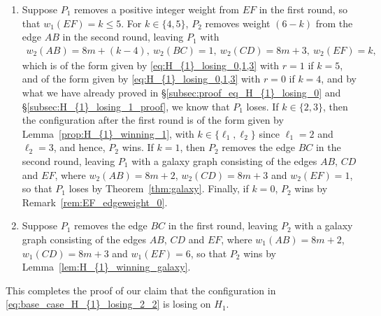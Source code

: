 \documentclass[11pt,reqno]{amsart}
\theoremstyle{definition}
\theoremstyle{definition}
\begin{document}
\begin{enumerate}
\begin{enumerate}
\item Suppose $w_{1}(AB)=8m+i$ for $i \in \{0,1\}$ and $w_{1}(BC)=0$. This leaves $P_{2}$ with a galaxy graph consisting of the edges $AB$, $CD$ and $EF$, where $w_{1}(AB)=8m+i$, $w_{1}(CD)=8m+3$ and $w_{1}(EF)=6$, and $P_{2}$ wins by Lemma~\ref{lem:H_{1}_winning_galaxy}. 

\item Finally, suppose $w_{1}(AB)=8n+\ell_{1}$ for some $n < m$ and $\ell_{1} \in \{0,1,\ldots,7\}$, and as argued above in \eqref{item_1}, this leads to $P_{2}$ winning due to Lemma~\ref{prop:H_{1}_winning_1}.
\end{enumerate}

\item Suppose $P_{1}$ removes a positive integer weight from $EF$ in the first round, so that $w_{1}(EF)=k\leqslant 5$. For $k \in \{4,5\}$, $P_{2}$ removes weight $(6-k)$ from the edge $AB$ in the second round, leaving $P_{1}$ with 
\begin{align}
w_{2}(AB)=8m+(k-4),\ w_{2}(BC)=1,\ w_{2}(CD)=8m+3,\ w_{2}(EF)=k,\nonumber
\end{align}
which is of the form given by \eqref{eq:H_{1}_losing_0,1,3} with $r=1$ if $k=5$, and of the form given by \eqref{eq:H_{1}_losing_0,1,3} with $r=0$ if $k=4$, and by what we have already proved in \S\ref{subsec:proof_eq_H_{1}_losing_0} and \S\ref{subsec:H_{1}_losing_1_proof}, we know that $P_{1}$ loses. If $k \in \{2,3\}$, then the configuration after the first round is of the form given by Lemma~\ref{prop:H_{1}_winning_1}, with $k \in \{\ell_{1},\ell_{2}\}$ since $\ell_{1}=2$ and $\ell_{2}=3$, and hence, $P_{2}$ wins. If $k=1$, then $P_{2}$ removes the edge $BC$ in the second round, leaving $P_{1}$ with a galaxy graph consisting of the edges $AB$, $CD$ and $EF$, where $w_{2}(AB)=8m+2$, $w_{2}(CD)=8m+3$ and $w_{2}(EF)=1$, so that $P_{1}$ loses by Theorem~\ref{thm:galaxy}. Finally, if $k=0$, $P_{2}$ wins by Remark~\ref{rem:EF_edgeweight_0}.

\item Suppose $P_{1}$ removes the edge $BC$ in the first round, leaving $P_{2}$ with a galaxy graph consisting of the edges $AB$, $CD$ and $EF$, where $w_{1}(AB)=8m+2$, $w_{1}(CD)=8m+3$ and $w_{1}(EF)=6$, so that $P_{2}$ wins by Lemma~\ref{lem:H_{1}_winning_galaxy}. 
\end{enumerate}

This completes the proof of our claim that the configuration in \eqref{eq:base_case_H_{1}_losing_2_2} is losing on $H_{1}$.
\end{document}
